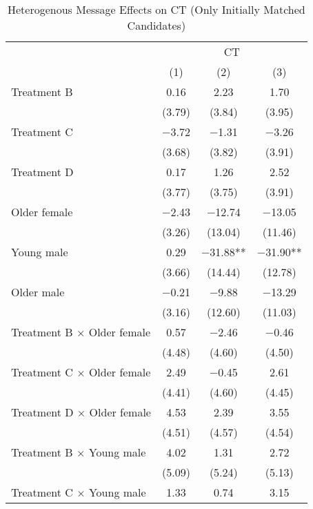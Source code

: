 \documentclass[12pt, a4paper]{article}
\begin{document}
\begin{table}[H]

\caption{\label{tab:lm-test-interaction-init-reg}Heterogenous Message Effects on CT (Only Initially Matched Candidates)}
\centering
\fontsize{8}{10}\selectfont
\begin{threeparttable}
\begin{tabular}[t]{lccc}
\toprule
\multicolumn{1}{c}{ } & \multicolumn{3}{c}{CT} \\
\cmidrule(l{3pt}r{3pt}){2-4}
  & (1) & (2) & (3)\\
\midrule
Treatment B & \num{0.16} & \num{2.23} & \num{1.70}\\
 & (\num{3.79}) & (\num{3.84}) & (\num{3.95})\\
Treatment C & \num{-3.72} & \num{-1.31} & \num{-3.26}\\
 & (\num{3.68}) & (\num{3.82}) & (\num{3.91})\\
Treatment D & \num{0.17} & \num{1.26} & \num{2.52}\\
 & (\num{3.77}) & (\num{3.75}) & (\num{3.91})\\
Older female & \num{-2.43} & \num{-12.74} & \num{-13.05}\\
 & (\num{3.26}) & (\num{13.04}) & (\num{11.46})\\
Young male & \num{0.29} & \num{-31.88}** & \num{-31.90}**\\
 & (\num{3.66}) & (\num{14.44}) & (\num{12.78})\\
Older male & \num{-0.21} & \num{-9.88} & \num{-13.29}\\
 & (\num{3.16}) & (\num{12.60}) & (\num{11.03})\\
Treatment B $\times$ Older female & \num{0.57} & \num{-2.46} & \num{-0.46}\\
 & (\num{4.48}) & (\num{4.60}) & (\num{4.50})\\
Treatment C $\times$ Older female & \num{2.49} & \num{-0.45} & \num{2.61}\\
 & (\num{4.41}) & (\num{4.60}) & (\num{4.45})\\
Treatment D $\times$ Older female & \num{4.53} & \num{2.39} & \num{3.55}\\
 & (\num{4.51}) & (\num{4.57}) & (\num{4.54})\\
Treatment B $\times$ Young male & \num{4.02} & \num{1.31} & \num{2.72}\\
 & (\num{5.09}) & (\num{5.24}) & (\num{5.13})\\
Treatment C $\times$ Young male & \num{1.33} & \num{0.74} & \num{3.15}\\

\end{tabular}
\end{threeparttable}
\end{table}
\end{document}
